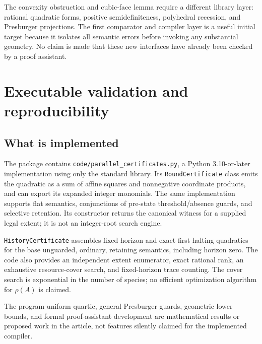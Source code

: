 \documentclass[11pt,letterpaper]{article}
\theoremstyle{definition}
\theoremstyle{remark}
\begin{document}
The convexity obstruction and cubic-face lemma require a different
library layer: rational quadratic forms, positive semidefiniteness,
polyhedral recession, and Presburger projections. The first comparator
and compiler layer is a useful initial target because it isolates all
semantic errors before invoking any substantial geometry. No claim is
made that these new interfaces have already been checked by a proof
assistant.

\section{Executable validation and reproducibility}\label{qoc:mp:sec:validation}
\subsection{What is implemented}
The package contains \texttt{code/parallel\_certificates.py}, a Python
3.10-or-later implementation using only the standard library. Its
\texttt{RoundCertificate} class emits the quadratic as a sum of affine
squares and nonnegative coordinate products, and can export its expanded
integer monomials. The same implementation supports flat semantics,
conjunctions of pre-state threshold/absence guards, and selective
retention. Its constructor returns the canonical witness for a supplied
legal extent; it is not an integer-root search engine.

\texttt{HistoryCertificate} assembles fixed-horizon and exact-first-halting
quadratics for the base unguarded, ordinary, retaining semantics, including
horizon zero. The code also provides an independent extent enumerator,
exact rational rank, an exhaustive resource-cover search, and fixed-horizon
trace counting. The cover search is exponential in the number of species;
no efficient optimization algorithm for $\rho(A)$ is claimed.

The program-uniform quartic, general Presburger guards, geometric lower
bounds, and formal proof-assistant development are mathematical results
or proposed work in the article, not features silently claimed for the
implemented compiler.
\end{document}
